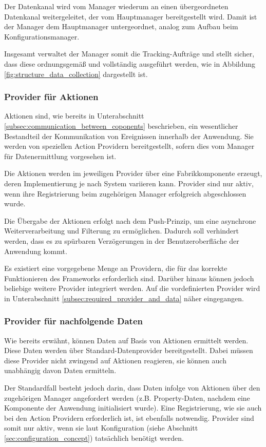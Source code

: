 Der Datenkanal wird vom Manager wiederum an einen übergeordneten Datenkanal weitergeleitet, der vom Hauptmanager bereitgestellt wird. Damit ist der Manager dem Hauptmanager untergeordnet, analog zum Aufbau beim Konfigurationsmanager.

Insgesamt verwaltet der Manager somit die Tracking-Aufträge und stellt sicher, dass diese ordnungsgemäß und vollständig ausgeführt werden, wie in Abbildung \ref{fig:structure_data_collection} dargestellt ist.

\subsubsection{Provider für Aktionen}
Aktionen sind, wie bereits in Unterabschnitt \ref{subsec:communication_between_coponents} beschrieben, ein wesentlicher Bestandteil der Kommunikation von Ereignissen innerhalb der Anwendung. Sie werden von speziellen Action Providern bereitgestellt, sofern dies vom Manager für Datenermittlung vorgesehen ist.

Die Aktionen werden im jeweiligen Provider über eine Fabrikkomponente erzeugt, deren Implementierung je nach System variieren kann. Provider sind nur aktiv, wenn ihre Registrierung beim zugehörigen Manager erfolgreich abgeschlossen wurde.

Die Übergabe der Aktionen erfolgt nach dem Push-Prinzip, um eine asynchrone Weiterverarbeitung und Filterung zu ermöglichen. Dadurch soll verhindert werden, dass es zu spürbaren Verzögerungen in der Benutzeroberfläche der Anwendung kommt.

Es existiert eine vorgegebene Menge an Providern, die für das korrekte Funktionieren des Frameworks erforderlich sind. Darüber hinaus können jedoch beliebige weitere Provider integriert werden. Auf die vordefinierten Provider wird in Unterabschnitt \ref{subsec:required_provider_and_data} näher eingegangen.

\subsubsection{Provider für nachfolgende Daten}
Wie bereits erwähnt, können Daten auf Basis von Aktionen ermittelt werden. Diese Daten werden über Standard-Datenprovider bereitgestellt. Dabei müssen diese Provider nicht zwingend auf Aktionen reagieren, sie können auch unabhängig davon Daten ermitteln.

Der Standardfall besteht jedoch darin, dass Daten infolge von Aktionen über den zugehörigen Manager angefordert werden (z.B. Property-Daten, nachdem eine Komponente der Anwendung initialisiert wurde). Eine Registrierung, wie sie auch bei den Action Providern erforderlich ist, ist ebenfalls notwendig. Provider sind somit nur aktiv, wenn sie laut Konfiguration (siehe Abschnitt \ref{sec:configuration_concept}) tatsächlich benötigt werden.

